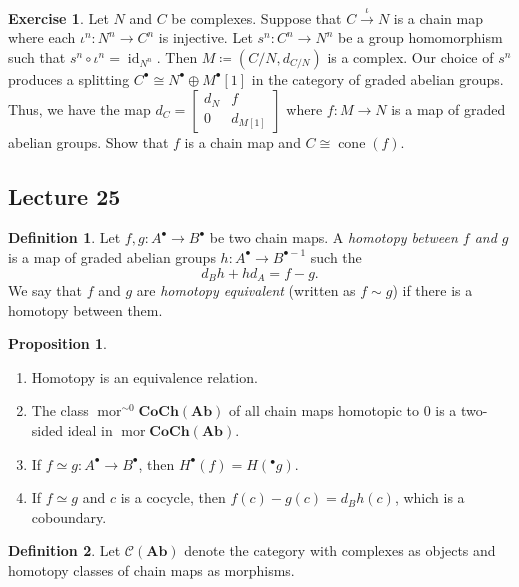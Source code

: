 \documentclass[10pt,letterpaper,cm]{nupset}
\theoremstyle{definition}
\newtheorem*{definition}{Definition}
\newtheorem{prop}{Proposition}
\newtheorem{exercise}{Exercise}
\newcommand{\1}{\mathbf{1}}
\newcommand{\0}{\vec 0}
\DeclareMathOperator{\id}{id}
\DeclareMathOperator{\mor}{mor}
\DeclareMathOperator{\cone}{cone}
\begin{document}
\begin{exercise} 
\item  Let $N$ and $C$ be complexes. Suppose that $C \overset{\iota}{\longrightarrow} N$ is a chain map where each $\iota^n :N^n \to C^n$ is injective. Let $s^n : C^n \to N^n$ be a group homomorphism such that $s^n \circ \iota^n = \id_{N^n}$. Then $M\coloneqq  (C/N, d_{C/N})$ is a complex. Our choice of $s^n$ produces a splitting $C^{\bullet} \cong N^{\bullet} \oplus M^{\bullet}[1]$ in the category of  graded abelian groups. Thus, we have the map $d_C = \begin{bmatrix} d_N & f \\ 0 & d_{M[1]} \end{bmatrix}$ where $f: M \to N$ is a map of graded abelian groups. Show that $f$ is a chain map and $C \cong \cone(f)$.
\end{exercise}

\subsection{Lecture 25}

\begin{definition}
Let $f, g : A^{\bullet} \to B^{\bullet}$ be two chain maps. A \textit{homotopy between $f$ and $g$} is a map of graded abelian groups $h: A^{\bullet} \to B^{\bullet -1}$ such the $$d_Bh + hd_A = f-g. $$ We say that $f$ and $g$ are \textit{homotopy equivalent} (written as $f \sim g$) if there is a homotopy between them.
\end{definition}

\begin{prop} $ $
\begin{enumerate}
\item Homotopy is an equivalence relation. 
\item The class $\mor^{\sim{0}}{\mathbf{CoCh(Ab)}}$ of all chain maps homotopic to $0$ is a two-sided ideal in  $\mor{\mathbf{CoCh(Ab)}}$. 
\item If $ f \simeq g: A^{\bullet} \to B^{\bullet}$, then $H^{\bullet}(f) = H(^{\bullet}g)$.
\item If $f\simeq g$ and $c$ is a cocycle, then $f(c) - g(c) = d_Bh(c)$, which is a coboundary.
\end{enumerate}
\end{prop}

\begin{definition}
Let $\mathcal{C}(\mathbf{Ab})$ denote the category with complexes as objects and homotopy classes of chain maps as morphisms.  
\end{definition}
\end{document}
